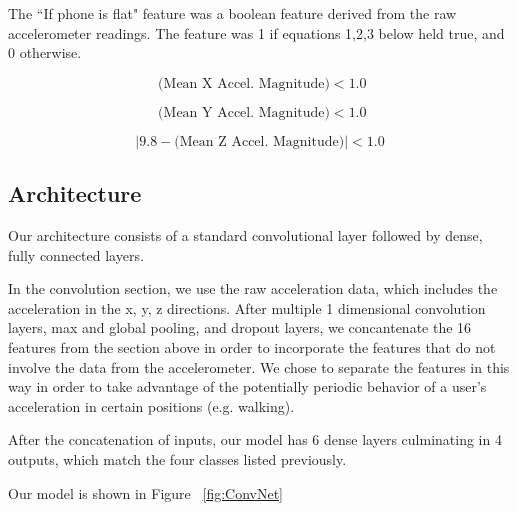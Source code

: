 The ``If phone is flat" feature was a boolean feature derived from the raw accelerometer readings. 
The feature was 1 if equations 1,2,3 below held true, and 0 otherwise.

\begin{equation}\label{eq1}
    \text{       (Mean X Accel. Magnitude)} < 1.0 
\end{equation}

\begin{equation}\label{eq2}
\text{            (Mean Y Accel. Magnitude)} < 1.0
\end{equation}

\begin{equation}\label{eq1}
|9.8 - \text{(Mean Z Accel. Magnitude)}| < 1.0
\end{equation}



\subsection{Architecture}
Our architecture consists of a standard convolutional layer followed by dense, fully connected layers.


\begin{figure*}[!h]
  \vspace{-0.2cm}
  \centering
   {}
  \caption{The architecture of our convolutional neural net}
  \label{fig:ConvNet}
  \vspace{-0.1cm}
\end{figure*}

In the convolution section, we use the raw acceleration data, which includes the acceleration in the x, y, z directions. 
After multiple 1 dimensional convolution layers, max and global pooling, and dropout layers, 
we concantenate the 16 features from the section above in order to incorporate the features that do not involve the data from the accelerometer. 
We chose to separate the features in this way in order to take advantage of the potentially periodic behavior of a user's acceleration in certain positions (e.g. walking).

After the concatenation of inputs, our model has 6 dense layers culminating in  4 outputs, which match the four classes listed previously. 

Our model is shown in Figure ~\ref{fig:ConvNet}
